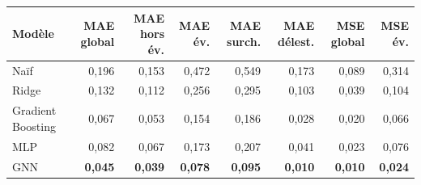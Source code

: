 \begin{tabular}{lrrrrrrr}
\toprule
Modèle & MAE global & MAE hors év. & MAE év. & MAE surch. & MAE délest. & MSE global & MSE év. \\
\midrule
Naïf & 0{,}196 & 0{,}153 & 0{,}472 & 0{,}549 & 0{,}173 & 0{,}089 & 0{,}314 \\
Ridge & 0{,}132 & 0{,}112 & 0{,}256 & 0{,}295 & 0{,}103 & 0{,}039 & 0{,}104 \\
Gradient Boosting & 0{,}067 & 0{,}053 & 0{,}154 & 0{,}186 & 0{,}028 & 0{,}020 & 0{,}066 \\
MLP & 0{,}082 & 0{,}067 & 0{,}173 & 0{,}207 & 0{,}041 & 0{,}023 & 0{,}076 \\
GNN & \textbf{0{,}045} & \textbf{0{,}039} & \textbf{0{,}078} & \textbf{0{,}095} & \textbf{0{,}010} & \textbf{0{,}010} & \textbf{0{,}024} \\
\bottomrule
\end{tabular}